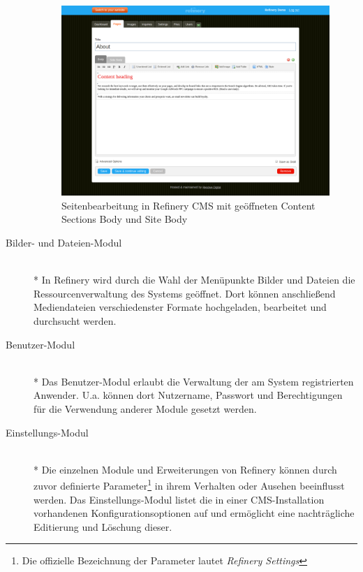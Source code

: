 \begin{description}
\begin{figure}[!h]
\begin{center}
\includegraphics[scale=0.3]{images/analyse/refinery/contentsections.png}
\caption{Seitenbearbeitung in Refinery CMS mit geöffneten Content Sections Body und Site Body}
\label{contentsections}
\end{center}
\end{figure}
\item[Bilder- und Dateien-Modul]\mbox{~}\\*
In Refinery wird durch die Wahl der Menüpunkte Bilder und Dateien die Ressourcenverwaltung des Systems geöffnet. Dort können anschließend 	Mediendateien verschiedenster Formate hochgeladen, bearbeitet und durchsucht werden.
\item[Benutzer-Modul]\mbox{~}\\*
Das Benutzer-Modul erlaubt die Verwaltung der am System registrierten 	Anwender. U.a. können dort Nutzername, Passwort und Berechtigungen für die Verwendung anderer Module gesetzt werden.
\item[Einstellungs-Modul]\mbox{~}\\*
Die einzelnen Module und Erweiterungen von Refinery können durch zuvor definierte Parameter\footnote{Die offizielle Bezeichnung der Parameter lautet \emph{Refinery Settings}} in ihrem Verhalten oder Ausehen beeinflusst werden. Das Einstellungs-Modul listet die in einer CMS-Installation vorhandenen Konfigurationsoptionen auf und ermöglicht eine nachträgliche Editierung und Löschung dieser.
\end{description}

